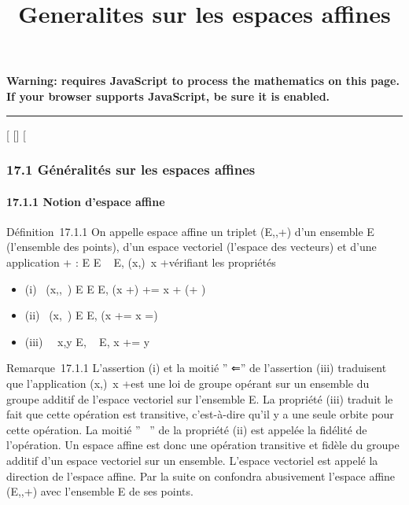 \documentclass[]{article}
\title{Generalites sur les espaces affines}
\author{}
\date{}
\begin{document}
\maketitle

\textbf{Warning: 
requires JavaScript to process the mathematics on this page.\\ If your
browser supports JavaScript, be sure it is enabled.}

\begin{center}\rule{3in}{0.4pt}\end{center}

[
[]
[

\subsubsection{17.1 Généralités sur les espaces affines}

\paragraph{17.1.1 Notion d'espace affine}

Définition~17.1.1 On appelle espace affine un triplet
(E,\overrightarrowE,+) d'un ensemble E (l'ensemble
des points), d'un espace vectoriel \overrightarrowE
(l'espace des vecteurs) et d'une application + : E
\times\overrightarrow E \rightarrow~ E,
(x,\overrightarrow\xi)\mapsto~x
+\overrightarrow \xi vérifiant les propriétés

\begin{itemize}
\itemsep1pt\parskip0pt
\item
  (i)
  \forall~(x,\overrightarrow\xi,\overrightarrow\eta~)
  \in E \times\overrightarrow E
  \times\overrightarrow E, (x
  +\overrightarrow \xi)
  +\overrightarrow \eta = x +
  (\overrightarrow\xi +\overrightarrow
  \eta)
\item
  (ii)
  \forall~(x,\overrightarrow\xi~) \in E
  \times\overrightarrow E, \left (x
  +\overrightarrow \xi = x \Leftrightarrow
  \overrightarrow\xi =\right )
\item
  (iii) \forall~~x,y \in E,
  \exists\overrightarrow\xi~
  \in\overrightarrow E, x
  +\overrightarrow \xi = y
\end{itemize}

Remarque~17.1.1 L'assertion (i) et la moitié '' ⇐'' de l'assertion (iii)
traduisent que l'application
(x,\overrightarrow\xi)\mapsto~x
+\overrightarrow \xi est une loi de groupe opérant sur
un ensemble du groupe additif de l'espace vectoriel
\overrightarrowE sur l'ensemble E. La propriété (iii)
traduit le fait que cette opération est transitive, c'est-à-dire qu'il y
a une seule orbite pour cette opération. La moitié '' \rigtharrow~'' de la
propriété (ii) est appelée la fidélité de l'opération. Un espace affine
est donc une opération transitive et fidèle du groupe additif d'un
espace vectoriel sur un ensemble. L'espace vectoriel
\overrightarrowE est appelé la direction de l'espace
affine. Par la suite on confondra abusivement l'espace affine
(E,\overrightarrowE,+) avec l'ensemble E de ses
points.
\end{document}
